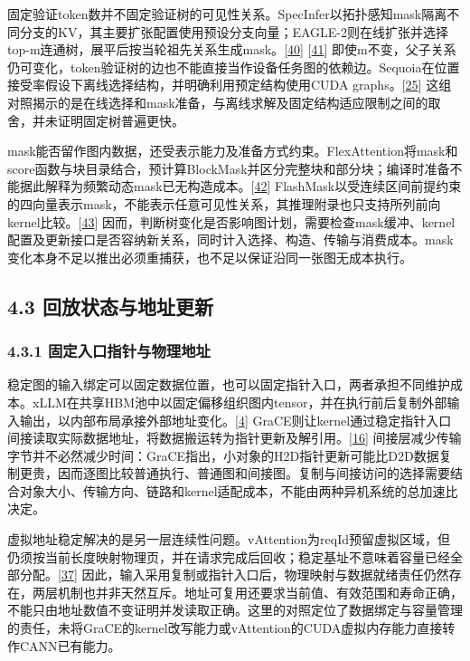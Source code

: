 \documentclass[
  11pt,
  UTF8]{ctexart}
\begin{document}
固定验证token数并不固定验证树的可见性关系。SpecInfer以拓扑感知mask隔离不同分支的KV，其主要扩张配置使用预设分支向量；EAGLE-2则在线扩张并选择top-m连通树，展平后按当轮祖先关系生成mask。{[}\protect\hyperlink{ref-miao2024specinfer}{40}{]}
{[}\protect\hyperlink{ref-li2024eagle2}{41}{]}
即使m不变，父子关系仍可变化，token验证树的边也不能直接当作设备任务图的依赖边。Sequoia在位置接受率假设下离线选择结构，并明确利用预定结构使用CUDA
graphs。{[}\protect\hyperlink{ref-chen2024sequoia}{25}{]}
这组对照揭示的是在线选择和mask准备，与离线求解及固定结构适应限制之间的取舍，并未证明固定树普遍更快。

mask能否留作图内数据，还受表示能力及准备方式约束。FlexAttention将mask和score函数与块目录结合，预计算BlockMask并区分完整块和部分块；编译时准备不能据此解释为频繁动态mask已无构造成本。{[}\protect\hyperlink{ref-dong2025flexattention}{42}{]}
FlashMask以受连续区间前提约束的四向量表示mask，不能表示任意可见性关系，其推理附录也只支持所列前向kernel比较。{[}\protect\hyperlink{ref-wang2025flashmask}{43}{]}
因而，判断树变化是否影响图计划，需要检查mask缓冲、kernel配置及更新接口是否容纳新关系，同时计入选择、构造、传输与消费成本。mask变化本身不足以推出必须重捕获，也不足以保证沿同一张图无成本执行。

\hypertarget{section-4-3}{%
\subsection{4.3 回放状态与地址更新}\label{section-4-3}}

\hypertarget{section-4-3-1}{%
\subsubsection{4.3.1 固定入口指针与物理地址}\label{section-4-3-1}}

稳定图的输入绑定可以固定数据位置，也可以固定指针入口，两者承担不同维护成本。xLLM在共享HBM池中以固定偏移组织图内tensor，并在执行前后复制外部输入输出，以内部布局承接外部地址变化。{[}\protect\hyperlink{ref-liu2025xllm}{4}{]}
GraCE则让kernel通过稳定指针入口间接读取实际数据地址，将数据搬运转为指针更新及解引用。{[}\protect\hyperlink{ref-ghosh2026grace}{16}{]}
间接层减少传输字节并不必然减少时间：GraCE指出，小对象的H2D指针更新可能比D2D数据复制更贵，因而逐图比较普通执行、普通图和间接图。复制与间接访问的选择需要结合对象大小、传输方向、链路和kernel适配成本，不能由两种异机系统的总加速比决定。

虚拟地址稳定解决的是另一层连续性问题。vAttention为reqId预留虚拟区域，但仍须按当前长度映射物理页，并在请求完成后回收；稳定基址不意味着容量已经全部分配。{[}\protect\hyperlink{ref-prabhu2025vattention}{37}{]}
因此，输入采用复制或指针入口后，物理映射与数据就绪责任仍然存在，两层机制也并非天然互斥。地址可复用还要求当前值、有效范围和寿命正确，不能只由地址数值不变证明并发读取正确。这里的对照定位了数据绑定与容量管理的责任，未将GraCE的kernel改写能力或vAttention的CUDA虚拟内存能力直接转作CANN已有能力。
\end{document}
